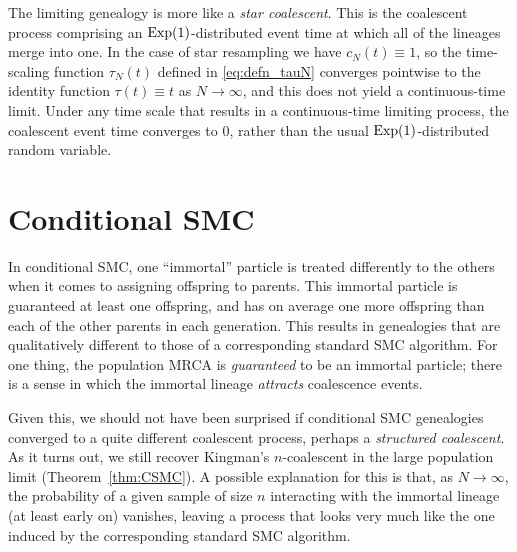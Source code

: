 The limiting genealogy is more like a \emph{star coalescent}\seb{[citation(s)]}. This is the coalescent process comprising an $\operatorname{Exp}(1)$-distributed event time at which all of the lineages merge into one.
In the case of star resampling we have $c_N(t) \equiv 1$, so the time-scaling function $\tau_N(t)$ defined in \eqref{eq:defn_tauN} converges pointwise to the identity function $\tau(t) \equiv t$ as $N\to\infty$, and this does not yield a continuous-time limit.
Under any time scale that results in a continuous-time limiting process, the coalescent event time converges to $0$, rather than the usual $\operatorname{Exp}(1)$-distributed random variable.






\section{Conditional SMC \seb{$\checkmark$} }
In conditional SMC, one ``immortal'' particle is treated differently to the others when it comes to assigning offspring to parents. This immortal particle is guaranteed at least one offspring, and has on average one more offspring than each of the other parents in each generation.
This results in genealogies that are qualitatively different to those of a corresponding standard SMC algorithm. For one thing, the population MRCA is \emph{guaranteed} to be an immortal particle; there is a sense in which the immortal lineage \emph{attracts} coalescence events.

Given this, we should not have been surprised if conditional SMC genealogies converged to a quite different coalescent process, perhaps a \emph{structured coalescent}\seb{[citation(s)]}.
As it turns out, we still recover Kingman's $n$-coalescent in the large population limit (Theorem~\ref{thm:CSMC}). 
A possible explanation for this is that, as $N\to\infty$, the probability of a given sample of size $n$ interacting with the immortal lineage (at least early on) vanishes, leaving a process that looks very much like the one induced by the corresponding standard SMC algorithm.

